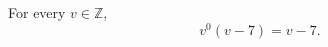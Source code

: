 \documentclass{article}
\begin{document}
\begin{corollary}\label{hold:zero}
For every $v\in\mathbb{Z}$,
\[v^0(v-7)=v-7.\]
\end{corollary}
\end{document}

